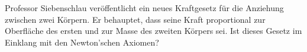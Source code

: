 Professor Siebenschlau veröffentlicht ein neues Kraftgesetz für die Anziehung zwischen zwei Körpern. Er behauptet, dass seine Kraft proportional zur Oberfläche des ersten und zur Masse des zweiten Körpers sei. Ist dieses Gesetz im Einklang mit den Newton'schen Axiomen?
